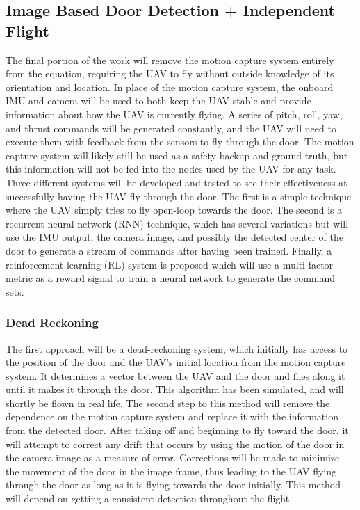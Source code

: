 \documentclass[12pt]{article}
\begin{document}
\subsection{Image Based Door Detection + Independent Flight}
The final portion of the work will remove the motion capture system entirely from the equation, requiring the UAV to fly without outside knowledge of its orientation and location. In place of the motion capture system, the onboard IMU and camera will be used to both keep the UAV stable and provide information about how the UAV is currently flying. A series of pitch, roll, yaw, and thrust commands will be generated constantly, and the UAV will need to execute them with feedback from the sensors to fly through the door. The motion capture system will likely still be used as a safety backup and ground truth, but this information will not be fed into the nodes used by the UAV for any task. Three different systems will be developed and tested to see their effectiveness at successfully having the UAV fly through the door. The first is a simple technique where the UAV simply tries to fly open-loop towards the door. The second is a recurrent neural network (RNN) technique, which has several variations but will use the IMU output, the camera image, and possibly the detected center of the door to generate a stream of commands after having been trained. Finally, a reinforcement learning (RL) system is proposed which will use a multi-factor metric as a reward signal to train a neural network to generate the command sets. 

\subsubsection{Dead Reckoning}
The first approach will be a dead-reckoning system, which initially has access to the position of the door and the UAV's initial location from the motion capture system. It determines a vector between the UAV and the door and flies along it until it makes it through the door. This algorithm has been simulated, and will shortly be flown in real life. The second step to this method will remove the dependence on the motion capture system and replace it with the information from the detected door. After taking off and beginning to fly toward the door, it will attempt to correct any drift that occurs by using the motion of the door in the camera image as a measure of error. Corrections will be made to minimize the movement of the door in the image frame, thus leading to the UAV flying through the door as long as it is flying towards the door initially. This method will depend on getting a consistent detection throughout the flight.
\end{document}
